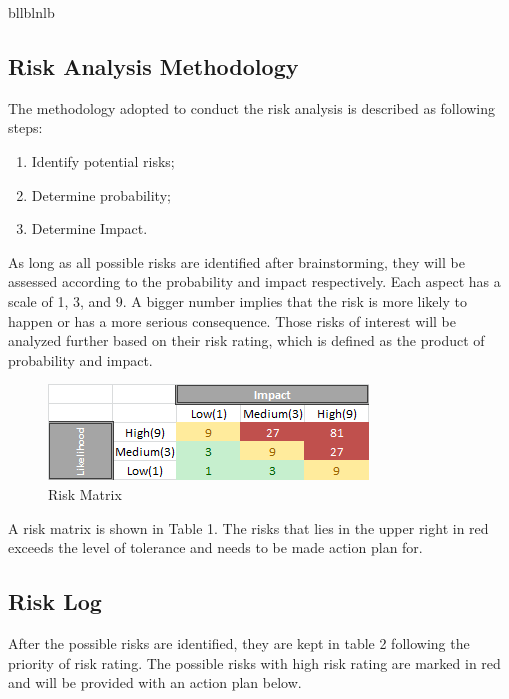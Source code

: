 

bllblnlb
\subsection{Risk Analysis Methodology}
The methodology adopted to conduct the risk analysis is described as following steps:  
\begin{enumerate}[itemsep=0pt, topsep=3pt, partopsep=3pt]
  \item Identify potential risks;
  \item Determine probability;
  \item Determine Impact.
\end{enumerate}

As long as all possible risks are identified after brainstorming, they will be assessed according to the probability and impact respectively. Each aspect has a scale of 1, 3, and 9. A bigger number implies that the risk is more likely to happen or has a more serious consequence. Those risks of interest will be analyzed further based on their risk rating, which is defined as the product of probability and impact. 


\begin{figure}[h!]
\centering
\includegraphics[scale=1.0]{Pictures/riskmatrix.png}
\caption{Risk Matrix}
\label{fig:riskmatrix}
\end{figure}

A risk matrix is shown in Table 1. The risks that lies in the upper right in red exceeds the level of tolerance and needs to be made action plan for. 
\subsection{Risk Log}
After the possible risks are identified, they are kept in table 2 following the priority of risk rating. The possible risks with high risk rating are marked in red and will be provided with an action plan below. 

